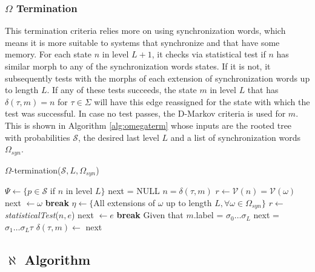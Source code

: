 {\subsubsection{$\Omega$ Termination}

This termination criteria relies more on using synchronization words, which means it is more suitable to systems that synchronize and that have some memory. For each state $n$ in level $L+1$, it checks via statistical test if $n$ has similar morph to any of the synchronization words states. If it is not, it subsequently tests with the morphs of each extension of synchronization words up to length $L$. If any of these tests succeeds, the state $m$ in level $L$ that has $\delta(\tau,m) = n$ for $\tau \in \Sigma$ will have this edge reassigned for the state with which the test was successful. In case no test passes, the D-Markov criteria is used for $m$. This is shown in Algorithm \ref{alg:omegaterm} whose inputs are the rooted tree with probabilities $\mathcal{S}$, the desired last level $L$ and a list of synchronization words $\Omega_{syn}$.  

  \begin{algorithm}
  \caption{$\Omega$-termination($\mathcal{S}, L, \Omega_{syn}$)\label{alg:omegaterm}}
    \begin{algorithmic}[1]
      	\State $\Psi \gets \{p \in \mathcal{S}$ if $n$ in level $L\}$
      		\State next = NULL
      		\For{$\tau \in \Sigma$}
      			\State $n = \delta(\tau,m)$
      				\State $r \gets \mathcal{V}(n) = \mathcal{V}(\omega)$
      					\State next $\gets \omega$
      					\State \textbf{break}
      				\EndIf
      			\EndFor
      				\State $\eta \gets \{$All extensions of $\omega$ up to length $L, \forall \omega \in \Omega_{syn}\}$
      				\State $r \gets$ \textit{statisticalTest}($n, e$)
      						\State next $\gets e$
      						\State \textbf{break}
      					\EndIf
      				\EndFor
      			\EndIf
      				\State Given that $m$.label = $\sigma_0\ldots\sigma_L$
      				\State next = $\sigma_1\ldots\sigma_L\tau$
      			\EndIf
      			\State $\delta(\tau,m) \gets$ next
      		\EndFor
      	\EndFor
      \EndProcedure
    \end{algorithmic}
  \end{algorithm}

\subsection{$\aleph$ Algorithm}

}
